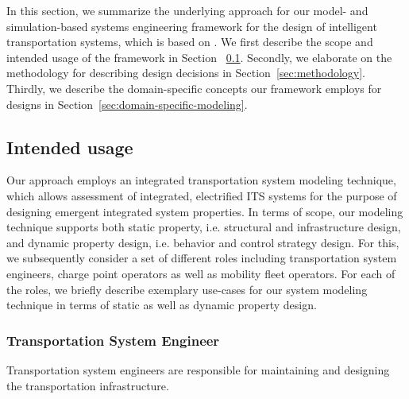\documentclass[a4paper,twoside]{article}
\begin{document}
	In this section, we summarize the underlying approach for our model- and simulation-based systems engineering framework for the design of intelligent transportation systems, which is based on \cite{ascher_hackenberg_2015,ascher_hackenberg_2016,ascher_hackenberg_2017,ascher_hackenberg_albayrak_2023,ascher2023discrete}.
	We first describe the scope and intended usage of the framework in Section ~\ref{sec:scope}.
	Secondly, we elaborate on the methodology for describing design decisions in Section~\ref{sec:methodology}.
	Thirdly, we describe the domain-specific concepts our framework employs for designs in Section~\ref{sec:domain-specific-modeling}.
	
	\subsection{Intended usage}
	\label{sec:scope}
	
	Our approach employs an integrated transportation system modeling technique, which allows assessment of integrated, electrified ITS systems for the purpose of designing emergent integrated system properties.
	In terms of scope, our modeling technique supports both static property, i.e. structural and infrastructure design, and dynamic property design, i.e. behavior and control strategy design. For this, we subsequently consider a set of different roles including transportation system engineers, charge point operators as well as mobility fleet operators. For each of the roles, we briefly describe exemplary use-cases for our system modeling technique in terms of static as well as dynamic property design.

\subsubsection{Transportation System Engineer}
Transportation system engineers are responsible for maintaining and designing the transportation infrastructure.

\end{document}
